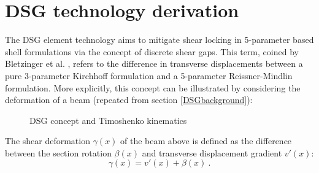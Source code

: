 
\chapter{DSG technology derivation}
\label{app:DSG technology derivation}
\renewcommand{\Thema}{DSG technology derivation}

The DSG element technology aims to mitigate shear locking in 5-parameter based shell formulations via the concept of discrete shear gaps. This term, coined by Bletzinger et al. \cite{Ble00}, refers to the difference in transverse displacements between a pure 3-parameter Kirchhoff formulation and a 5-parameter Reissner-Mindlin formulation. More explicitly, this concept can be illustrated by considering the deformation of a beam (repeated from section \ref{DSGbackground}):

\begin{figure}[H]
	\caption{\label{DSG_derivation_pic1}DSG concept and Timoshenko kinematics \cite{Ble00}}
\end{figure}

The shear deformation $\gamma(x)$ of the beam above is defined as the difference between the section rotation $\beta(x)$ and transverse displacement gradient $v'(x)$:
\begin{equation} 
\gamma(x) = v'(x) + \beta(x)
\label{DSG_derivation_0}\ .
\end{equation}

